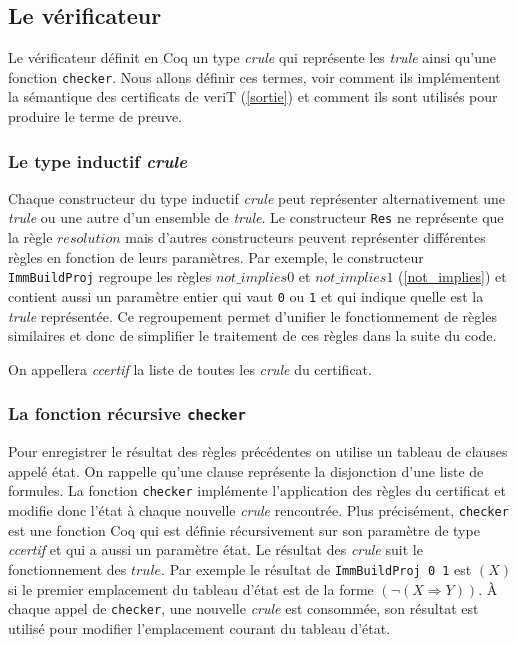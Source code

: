 \documentclass[11pt]{article}
\begin{document}
\subsection{Le vérificateur}

Le vérificateur définit en Coq un type \textit{crule} qui représente les \textit{trule} ainsi qu'une fonction \texttt{checker}. Nous allons définir ces termes, voir comment ils implémentent la sémantique des certificats de veriT (\ref{sortie}) et comment ils sont utilisés pour produire le terme de preuve.


\subsubsection{Le type inductif \textit{crule}}\label{regroupement}


Chaque constructeur du type inductif \textit{crule} peut représenter alternativement une \textit{trule} ou une autre d'un ensemble de \textit{trule}. Le constructeur \texttt{Res} ne représente que la règle $resolution$ mais d'autres constructeurs peuvent représenter différentes règles en fonction de leurs paramètres. Par exemple, le constructeur \texttt{ImmBuildProj} regroupe les règles $not\_implies0$ et $not\_implies1$ (\ref{not_implies}) et contient aussi un paramètre entier qui vaut \texttt{0} ou \texttt{1} et qui indique quelle est la \textit{trule} représentée. Ce regroupement permet d'unifier le fonctionnement de règles similaires et donc de simplifier le traitement de ces règles dans la suite du code. \medbreak

On appellera \textit{ccertif} la liste de toutes les \textit{crule} du certificat.


\subsubsection{La fonction récursive \texttt{checker}} \label{checker}

Pour enregistrer le résultat des règles précédentes on utilise un tableau de clauses appelé état. On rappelle qu'une clause représente la disjonction d'une liste de formules. La fonction \texttt{checker} implémente l'application des règles du certificat et modifie donc l'état à chaque nouvelle \textit{crule} rencontrée. Plus précisément, \texttt{checker} est une fonction Coq qui est définie récursivement sur son paramètre de type \textit{ccertif} et qui a aussi un paramètre état. Le résultat des \textit{crule} suit le fonctionnement des $trule$. Par exemple le résultat de \texttt{ImmBuildProj 0 1} est $(X)$ si le premier emplacement du tableau d'état est de la forme $(\neg (X \Rightarrow Y))$. À chaque appel de \texttt{checker}, une nouvelle \textit{crule} est consommée, son résultat est utilisé pour modifier l'emplacement courant du tableau d'état.\medbreak
\end{document}
